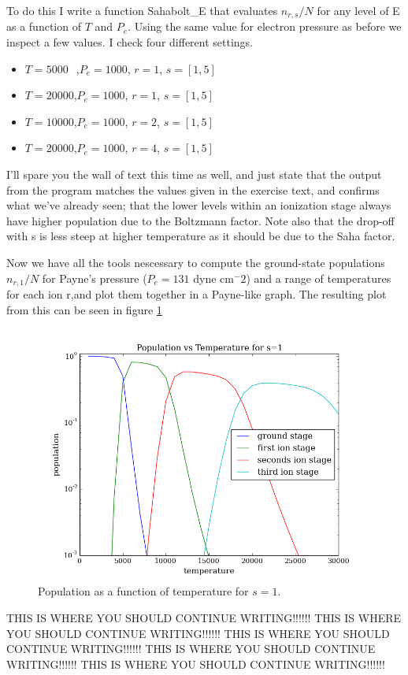 \documentclass{aa}   %
\begin{document}
To do this I write a function Sahabolt\_E that evaluates $n_{r,s}/N$ for any level of E as a function of $T$ and $P_e$.
Using the same value for electron pressure as before we inspect a few values. I check four different settings.
\begin{itemize}
 \item $T = 5000~$~,$P_e = 1000$, $r = 1$, $s = [1,5]$
 \item $T = 20000$,$P_e = 1000$, $r = 1$, $s = [1,5]$
 \item $T = 10000$,$P_e = 1000$, $r = 2$, $s = [1,5]$
 \item $T = 20000$,$P_e = 1000$, $r = 4$, $s = [1,5]$
\end{itemize}
I'll spare you the wall of text this time as well, and just state that the output from the program matches the values given in the exercise text, and confirms what we've already seen; that the lower levels within an ionization stage always have higher population due to the Boltzmann factor. Note also that the drop-off with s is less steep at higher temperature as it should be due to the Saha factor.

Now we have all the tools nescessary to compute the ground-state populations $n_{r,1}/N$ for Payne's pressure ($P_e = 131$ dyne cm$^-2$) and a range of temperatures for each ion r,and plot them together in a Payne-like graph. The resulting plot from this can be seen in figure \ref{pop_vs_t_for_s1}

\begin{figure}
 \includegraphics[width=.49\textwidth]{pop_vs_t_for_s1.png}
 \caption{Population as a function of temperature for $s = 1$.}
 \label{pop_vs_t_for_s1}
\end{figure}


THIS IS WHERE YOU SHOULD CONTINUE WRITING!!!!!!
THIS IS WHERE YOU SHOULD CONTINUE WRITING!!!!!!
THIS IS WHERE YOU SHOULD CONTINUE WRITING!!!!!!
THIS IS WHERE YOU SHOULD CONTINUE WRITING!!!!!!
THIS IS WHERE YOU SHOULD CONTINUE WRITING!!!!!!

\end{document}
